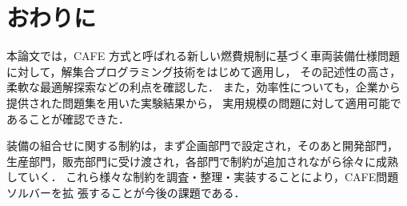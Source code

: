 \section{おわりに}

本論文では，CAFE 方式と呼ばれる新しい燃費規制に基づく車両装備仕様問題
に対して，解集合プログラミング技術をはじめて適用し，
その記述性の高さ，柔軟な最適解探索などの利点を確認した．
また，効率性についても，企業から提供された問題集を用いた実験結果から，
実用規模の問題に対して適用可能であることが確認できた．

装備の組合せに関する制約は，まず企画部門で設定され，そのあと開発部門，
生産部門，販売部門に受け渡され，各部門で制約が追加されながら徐々に成熟
していく．
これら様々な制約を調査・整理・実装することにより，CAFE問題ソルバーを拡
張することが今後の課題である．

